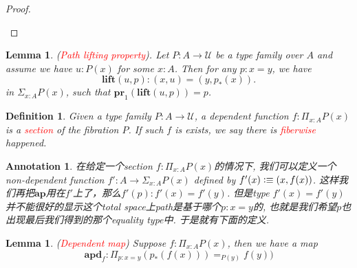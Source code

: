 \documentclass{article}
\newtheorem{lemma}[theorem]{Lemma}
\newtheorem{definition}[theorem]{Definition}
\newtheorem{annotation}[theorem]{Annotation}
\newcommand{\redt}[1]{\textcolor{red}{#1}}
\newcommand{\defeqv}{\vcentcolon\equiv}
\newcommand{\ap}{\textbf{ap}}
\newcommand{\apd}{\textbf{apd}}
\newcommand{\lift}{\textbf{lift}}
\newcommand{\pr}{\textbf{pr}}
\begin{document}
\begin{proof}
\begin{center}
\end{center}
\end{proof}

\begin{lemma}
\rm (\redt{Path lifting property}). Let $P : A \to \mathcal{U}$ be a type family over $A$ and assume we have $u : P(x)$ for some $x : A$. Then for any $p : x=y$, we have
\[
    \lift(u,p) : (x, u) = (y, p_*(x)).
\]
in $\Sigma_{x : A} P(x)$, such that $\pr_1(\lift(u,p)) = p$.
\end{lemma}

\begin{definition}
\rm Given a type family $P : A \to \mathcal{U}$, a dependent function $f : \Pi_{x :A} P(x)$ is a \redt{section} of the fibration $P$. If such $f$ is exists, we say there is \redt{fiberwise} happened.
\end{definition}

\begin{annotation}
\rm 在给定一个section $f : \Pi_{x :A} P(x)$的情况下, 我们可以定义一个non-dependent function $f' : A \to \Sigma_{x : A} P(x)$ defined by $f'(x) \defeqv (x, f(x))$. 这样我们再把$\ap$用在$f'$上了，那么$f'(p) : f'(x) = f'(y)$. 但是type $f'(x) = f'(y)$并不能很好的显示这个total space上path是基于哪个$p : x=y$的, 也就是我们希望$p$也出现最后我们得到的那个equality type中. 于是就有下面的定义. 
\end{annotation}

\begin{lemma}
\rm (\redt{Dependent map}) Suppose $f : \Pi_{x : A} P(x)$, then we have a map
\[
  \apd_f : \Pi_{p : x = y} (p_*(f(x))) =_{P(y)} f(y))  
\]
\end{lemma}
\end{document}
